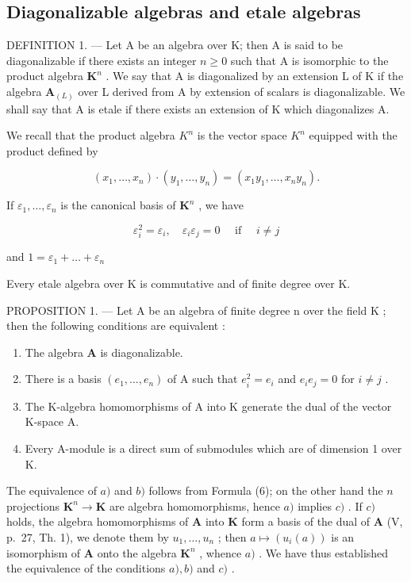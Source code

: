 \subsection{Diagonalizable algebras and etale algebras}

DEFINITION 1. --- Let A be an algebra over K; then A is said to be diagonalizable if there exists an integer \(n \geqslant 0\) such that A is isomorphic to the product algebra \(\mathbf{K}^n\) . We say that A is diagonalized by an extension L of K if the algebra \(\mathbf{A}_{(L)}\) over L derived from A by extension of scalars is diagonalizable. We shall say that A is etale if there exists an extension of K which diagonalizes A.

We recall that the product algebra \(K^{n}\) is the vector space \(K^{n}\) equipped with the product defined by

\[
\left(x _ {1}, \dots , x _ {n}\right) \cdot \left(y _ {1}, \dots , y _ {n}\right) = \left(x _ {1} y _ {1}, \dots , x _ {n} y _ {n}\right).\tag{5}
\]

If \(\varepsilon_1, \ldots, \varepsilon_n\) is the canonical basis of \(\mathbf{K}^n\) , we have

\[
\varepsilon_ {i} ^ {2} = \varepsilon_ {i}, \quad \varepsilon_ {i} \varepsilon_ {j} = 0 \quad \text { if } \quad i \neq j\tag{6}
\]

and \(1 = \varepsilon_{1} + \dots +\varepsilon_{n}\)

Every etale algebra over K is commutative and of finite degree over K.

PROPOSITION 1. --- Let A be an algebra of finite degree n over the field K ; then the following conditions are equivalent :

\begin{enumerate}
\def\labelenumi{\alph{enumi})}
\item
  The algebra \(\mathbf{A}\) is diagonalizable.
\item
  There is a basis \((e_1, \ldots, e_n)\) of A such that \(e_i^2 = e_i\) and \(e_i e_j = 0\) for \(i \neq j\) .
\item
  The K-algebra homomorphisms of A into K generate the dual of the vector K-space A.
\item
  Every A-module is a direct sum of submodules which are of dimension 1 over K.
\end{enumerate}

The equivalence of \(a)\) and \(b)\) follows from Formula (6); on the other hand the \(n\) projections \(\mathbf{K}^n \to \mathbf{K}\) are algebra homomorphisms, hence \(a)\) implies \(c)\) . If \(c)\) holds, the algebra homomorphisms of \(\mathbf{A}\) into \(\mathbf{K}\) form a basis of the dual of \(\mathbf{A}\) (V, p.~27, Th. 1), we denote them by \(u_1, \ldots, u_n\) ; then \(a \mapsto (u_i(a))\) is an isomorphism of \(\mathbf{A}\) onto the algebra \(\mathbf{K}^n\) , whence \(a)\) . We have thus established the equivalence of the conditions \(a), b)\) and \(c)\) .

